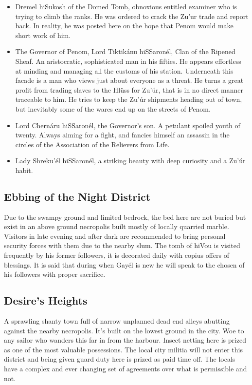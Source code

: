 \begin{itemize}
\item Dremel hiSukosh of the Domed Tomb, obnoxious entitled examiner who is trying to climb the ranks. He was ordered to crack the Zu'ur trade and report back. In reality, he was posted here on the hope that Penom would make short work of him.
\item The Governor of Penom, Lord Tiktikánu hiSSaronél, Clan of the Ripened Sheaf. An aristocratic, sophisticated man in his fifties. He appears effortless at minding and managing all the customs of his station. Underneath this facade is a man who views just about everyone as a threat. He turns a great profit from trading slaves to the Hlüss for Zu'úr, that is in no direct manner traceable to him. He tries to keep the Zu'úr shipments heading out of town, but inevitably some of the wares end up on the streets of Penom.
\item Lord Chernáru hiSSaronél, the Governor's son. A petulant spoiled youth of twenty. Always aiming for a fight, and fancies himself an assassin in the circles of the Association of the Relievers from Life.
\item Lady Shreku'él hiSSaronél, a striking beauty with deep curiosity and a Zu'úr habit.
\end{itemize}

\subsection{Ebbing of the Night District}

Due to the swampy ground and limited bedrock, the bed here are not buried but exist in an above ground necropolis built mostly of locally quarried marble. Visitors in late evening and after dark are recommended to bring personal security forces with them due to the nearby slum. The tomb of hiVou is visited frequently by his former followers, it is decorated daily with copius offers of blessings. It is said that during when Gayél is new he will speak to the chosen of his followers with proper sacrifice.

\subsection{Desire's Heights}

A sprawling shanty town full of narrow unplanned dead end alleys abutting against the nearby necropolis. It's built on the lowest ground in the city. Woe to any sailor who wanders this far in from the harbour. Insect netting here is prized as one of the most valuable possessions. The local city militia will not enter this district and being given guard duty here is prized as paid time off. The locals have a complex and ever changing set of agreements over what is permissible and not.


